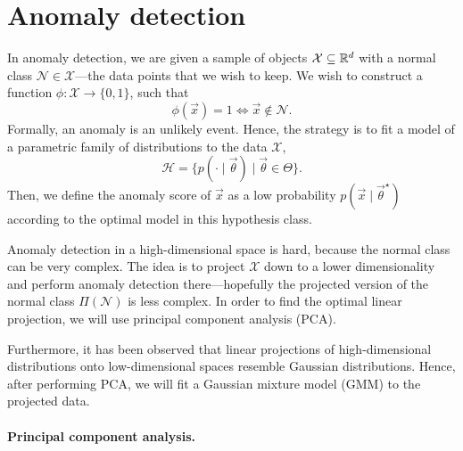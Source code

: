 \section{Anomaly detection}

In anomaly detection, we are given a sample of objects $\mathcal{X} \subseteq \mathbb{R}^d$ with a normal
class $\mathcal{N} \in \mathcal{X}$---the data points that we wish to keep. We wish to construct a
function $\phi: \mathcal{X} \to \{ 0,1 \}$, such that \[
    \phi(\vec{x}) = 1 \iff \vec{x} \not\in \mathcal{N}.
\]
Formally, an anomaly is an unlikely event. Hence, the strategy is to fit a model of a parametric
family of distributions to the data $\mathcal{X}$, \[
    \mathcal{H} = \{ p(\cdot \mid \vec{\theta}) \mid \vec{\theta} \in \Theta \}.
\]
Then, we define the anomaly score of $\vec{x}$ as a low probability $p(\vec{x} \mid
    \vec{\theta}^\star)$ according to the optimal model in this hypothesis class.

Anomaly detection in a high-dimensional space is hard, because the normal class can be very
complex. The idea is to project $\mathcal{X}$ down to a lower dimensionality and perform anomaly
detection there---hopefully the projected version of the normal class $\Pi(\mathcal{N})$ is less
complex. In order to find the optimal linear projection, we will use principal component analysis
(PCA).

Furthermore, it has been observed that linear projections of high-dimensional distributions onto
low-dimensional spaces resemble Gaussian distributions. Hence, after performing PCA, we will fit a
Gaussian mixture model (GMM) to the projected data.

\paragraph{Principal component analysis.}

